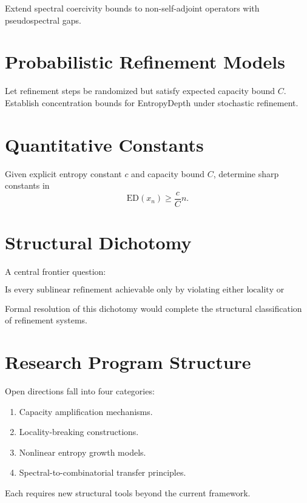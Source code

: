 \begin{problem}
Extend spectral coercivity bounds to non-self-adjoint operators with pseudospectral gaps.
\end{problem}

\section{Probabilistic Refinement Models}

\begin{problem}
Let refinement steps be randomized but satisfy expected capacity bound $C$.  
Establish concentration bounds for EntropyDepth under stochastic refinement.
\end{problem}

\section{Quantitative Constants}

\begin{problem}
Given explicit entropy constant $c$ and capacity bound $C$, determine sharp constants in
\[
\mathrm{ED}(x_n) \ge \frac{c}{C} n.
\]
\end{problem}

\section{Structural Dichotomy}

A central frontier question:

\[
\text{Is every sublinear refinement achievable only by violating either locality or bounded capacity?}
\]

Formal resolution of this dichotomy would complete the structural classification of refinement systems.

\section{Research Program Structure}

Open directions fall into four categories:

\begin{enumerate}
\item Capacity amplification mechanisms.
\item Locality-breaking constructions.
\item Nonlinear entropy growth models.
\item Spectral-to-combinatorial transfer principles.
\end{enumerate}

Each requires new structural tools beyond the current framework.
